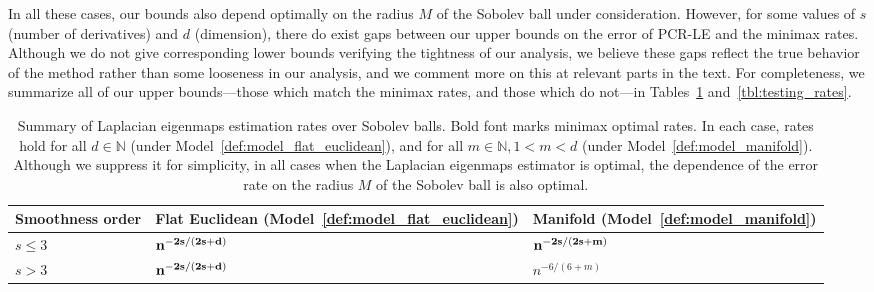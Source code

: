 \documentclass{article}
\theoremstyle{definition}
\newcommand{\1}{\mathbf{1}}
\begin{document}
	In all these cases, our bounds also depend optimally on the radius $M$ of the Sobolev ball under consideration. However, for some values of $s$ (number of derivatives) and $d$ (dimension), there do exist gaps between our upper bounds on the error of PCR-LE and the minimax rates. Although we do not give corresponding lower bounds verifying the tightness of our analysis, we believe these gaps reflect the true behavior of the method rather than some looseness in our analysis, and we comment more on this at relevant parts in the text. For completeness, we summarize all of our upper bounds---those which match the minimax rates, and those which do not---in Tables~\ref{tbl:estimation_rates} and~\ref{tbl:testing_rates}.
	\begin{table}
		\begin{center}
			\begin{tabular}{p{} | p{} p{} }
				Smoothness order & Flat Euclidean (Model~\ref{def:model_flat_euclidean}) & Manifold (Model~\ref{def:model_manifold}) \\
				\hline
				$s \leq 3$ & ${\bf n^{-2s/(2s + d)}}$ & ${\bf n^{-2s/(2s + m)}}$ \\
				$s > 3$  & ${\bf n^{-2s/(2s + d)}}$ & $n^{-6/(6 + m)}$
			\end{tabular}
		\end{center}
		\caption{Summary of Laplacian eigenmaps estimation rates over Sobolev balls. Bold font marks minimax optimal rates. In each case, rates hold for all $d \in \mathbb{N}$ (under Model~\ref{def:model_flat_euclidean}), and for all $m \in \mathbb{N}, 1 < m < d$ (under Model~\ref{def:model_manifold}). Although we suppress it for simplicity, in all cases when the Laplacian eigenmaps estimator is optimal, the dependence of the error rate on the radius $M$ of the Sobolev ball is also optimal.}
		\label{tbl:estimation_rates}
	\end{table}
	
\end{document}
